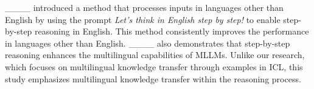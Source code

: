 ____ introduced a method that processes inputs in languages other than English by using the prompt \textit{Let’s think in English step by step!} to enable step-by-step reasoning in English.
This method consistently improves the performance in languages other than English.
____ also demonstrates that step-by-step reasoning enhances the multilingual capabilities of MLLMs.
Unlike our research, which focuses on multilingual knowledge transfer through examples in ICL, this study emphasizes multilingual knowledge transfer within the reasoning process.